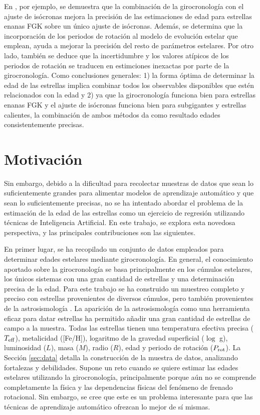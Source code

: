 En \cite{Angus19}, por ejemplo, se demuestra que la combinación de la girocronología con el ajuste de isócronas mejora la precisión de las estimaciones de edad para estrellas enanas FGK sobre un único ajuste de isócronas. Además, se determina que la incorporación de los periodos de rotación al modelo de evolución estelar que emplean, ayuda a mejorar la precisión del resto de parámetros estelares. Por otro lado, también se deduce que la incertidumbre y los valores atípicos de los periodos de rotación se traducen en estimciones inexactas por parte de la girocronología. Como conclusiones generales: 1) la forma óptima de determinar la edad de las estrellas implica combinar todos los observables disponibles que estén relacionados con la edad y 2) ya que la girocronología funciona bien para estrellas enanas FGK y el ajuste de isócronas funciona bien para subgigantes y estrellas calientes, la combinación de ambos métodos da como resultado edades consistentemente precisas.


\section{Motivación}

Sin embargo, debido a la dificultad para recolectar muestras de datos que sean lo suficientemente grandes para alimentar modelos de aprendizaje automático y que sean lo suficientemente precisas, no se ha intentado abordar el problema de la estimación de la edad de las estrellas como un ejercicio de regresión utilizando técnicas de Inteligencia Artificial. En este trabajo, se explora esta novedosa perspectiva, y las principales contribuciones son las siguientes.

En primer lugar, se ha recopilado un conjunto de datos empleados para determinar edades estelares mediante girocronología. En general, el conocimiento aportado sobre la girocronología se basa principalmente en los cúmulos estelares, los únicos sistemas con una gran cantidad de estrellas y una determinación precisa de la edad. Para este trabajo se ha construido un muestreo completo y preciso con estrellas provenientes de diversos cúmulos, pero también provenientes de la astrosismología \cite{Angus15, Metcalfe19, Saders16}. La aparición de la astrosismología como una herramienta eficaz para datar estrellas ha permitido añadir una gran cantidad de estrellas de campo a la muestra. Todas las estrellas tienen una temperatura efectiva precisa ($T_{\rm eff}$), metalicidad ([Fe/H]), logaritmo de la gravedad superficial ($\log$ g), luminosidad ($L$), masa ($M$), radio ($R$), edad y periodo de rotación ($P_{\rm rot}$). La Sección \ref{sec:data} detalla la construcción de la muestra de datos, analizando fortalezas y debilidades. Supone un reto cuando se quiere estimar las edades estelares utilizando la girocronología, principalmente porque aún no se comprende completamente la física y las dependencias físicas del fenómeno de frenado rotacional. Sin embargo, se cree que este es un problema interesante para que las técnicas de aprendizaje automático ofrezcan lo mejor de sí mismas.

